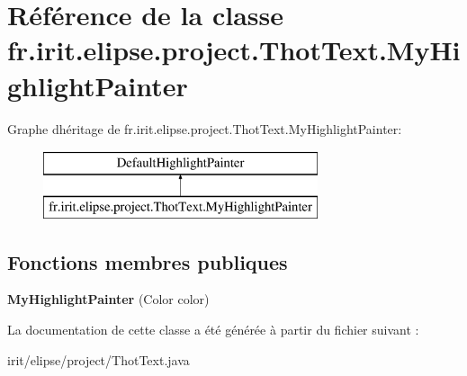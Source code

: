 \hypertarget{classfr_1_1irit_1_1elipse_1_1project_1_1_thot_text_1_1_my_highlight_painter}{}\section{Référence de la classe fr.\+irit.\+elipse.\+project.\+Thot\+Text.\+My\+Highlight\+Painter}
\label{classfr_1_1irit_1_1elipse_1_1project_1_1_thot_text_1_1_my_highlight_painter}
Graphe d\textquotesingle{}héritage de fr.\+irit.\+elipse.\+project.\+Thot\+Text.\+My\+Highlight\+Painter\+:\begin{figure}[H]
\begin{center}
\leavevmode
\includegraphics[height=2.000000cm]{classfr_1_1irit_1_1elipse_1_1project_1_1_thot_text_1_1_my_highlight_painter}
\end{center}
\end{figure}
\subsection*{Fonctions membres publiques}
\begin{DoxyCompactItemize}
\item 
\mbox{\label{classfr_1_1irit_1_1elipse_1_1project_1_1_thot_text_1_1_my_highlight_painter_a76c80747d0bb14178b745b31b69c7d20}} 
{\bfseries My\+Highlight\+Painter} (Color color)
\end{DoxyCompactItemize}


La documentation de cette classe a été générée à partir du fichier suivant \+:\begin{DoxyCompactItemize}
\item 
irit/elipse/project/Thot\+Text.\+java\end{DoxyCompactItemize}
